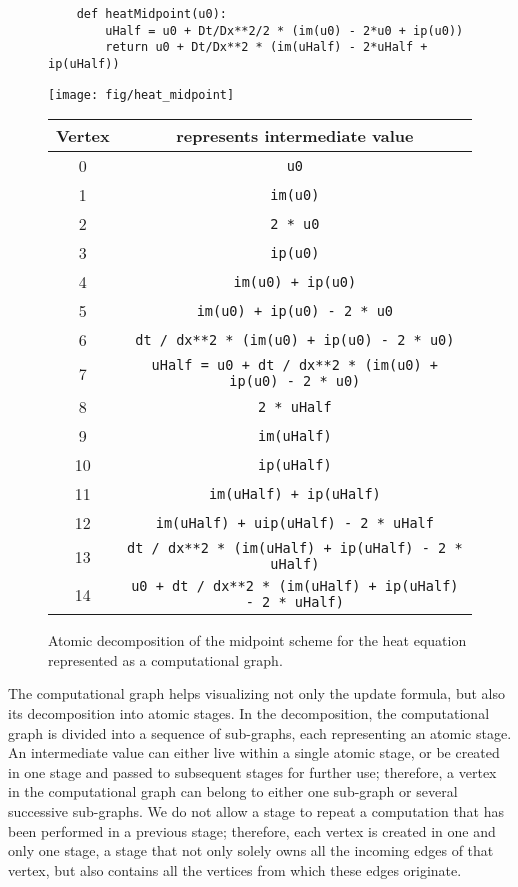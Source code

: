\documentclass[review]{siamart0216}
\begin{document}
\begin{figure}[htb!] \centering
    \begin{lstlisting}
    def heatMidpoint(u0):
        uHalf = u0 + Dt/Dx**2/2 * (im(u0) - 2*u0 + ip(u0))
        return u0 + Dt/Dx**2 * (im(uHalf) - 2*uHalf + ip(uHalf))
    \end{lstlisting}
    \texttt{[image: fig/heat\_midpoint]} \\
    \begin{tabular}{|c|c|}
        \hline
        Vertex & represents intermediate value \\
        \hline
        0 & \lstinline!u0! \\
        1 & \lstinline!im(u0)! \\
        2 & \lstinline!2 * u0! \\
        3 & \lstinline!ip(u0)! \\
        4 & \lstinline!im(u0) + ip(u0)! \\
        5 & \lstinline!im(u0) + ip(u0) - 2 * u0! \\
        6 & \lstinline!dt / dx**2 * (im(u0) + ip(u0) - 2 * u0)! \\
        7 & \lstinline!uHalf = u0 + dt / dx**2 * (im(u0) + ip(u0) - 2 * u0)! \\
        8 & \lstinline!2 * uHalf! \\
        9 & \lstinline!im(uHalf)! \\
       10 & \lstinline!ip(uHalf)! \\
       11 & \lstinline!im(uHalf) + ip(uHalf)! \\
       12 & \lstinline!im(uHalf) + uip(uHalf) - 2 * uHalf! \\
       13 & \lstinline!dt / dx**2 * (im(uHalf) + ip(uHalf) - 2 * uHalf)! \\
       14 & \lstinline!u0 + dt / dx**2 * (im(uHalf) + ip(uHalf) - 2 * uHalf)! \\
        \hline
    \end{tabular}
    \caption{Atomic decomposition of the midpoint scheme for the heat equation
             represented as a computational graph.}
    \label{f:decomp_heat}
\end{figure}

The computational graph helps visualizing not only the update formula,
but also its decomposition into atomic stages.  In the decomposition,
the computational graph is divided into a sequence of sub-graphs,
each representing an atomic stage.  An intermediate value
can either live within a single atomic stage, or be created in one stage
and passed to subsequent stages for further use; therefore,
a vertex in the computational graph can belong to either one sub-graph
or several successive sub-graphs.
We do not allow a stage to repeat a computation that has been performed
in a previous stage; therefore, each vertex is created in one and only one
stage, a stage that not only solely owns all the incoming edges of that vertex,
but also contains all the vertices from which these edges originate.
\end{document}
